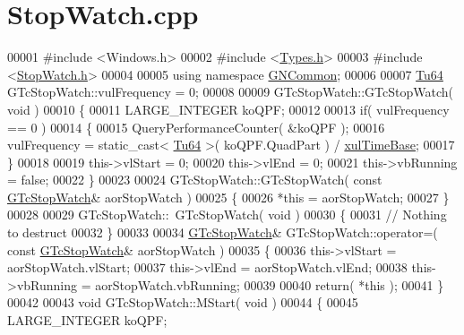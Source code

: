 \hypertarget{_stop_watch_8cpp_source}{}\section{Stop\+Watch.\+cpp}
\label{_stop_watch_8cpp_source}

\begin{DoxyCode}
00001 \textcolor{preprocessor}{#include <Windows.h>}
00002 \textcolor{preprocessor}{#include <\mbox{\hyperlink{_types_8h}{Types.h}}>}
00003 \textcolor{preprocessor}{#include <\mbox{\hyperlink{_stop_watch_8h}{StopWatch.h}}>}
00004 
00005 \textcolor{keyword}{using namespace }\mbox{\hyperlink{namespace_g_n_common}{GNCommon}};
00006 
00007 \mbox{\hyperlink{namespace_g_n_common_a9404ee6090c788ae70aebd1436ceb97d}{Tu64}} GTcStopWatch::vulFrequency = 0;
00008 
00009 GTcStopWatch::GTcStopWatch( \textcolor{keywordtype}{void} )
00010 \{
00011    LARGE\_INTEGER koQPF;
00012 
00013    \textcolor{keywordflow}{if}( vulFrequency == 0 )
00014    \{
00015       QueryPerformanceCounter( &koQPF );
00016       vulFrequency = \textcolor{keyword}{static\_cast<} \mbox{\hyperlink{namespace_g_n_common_a9404ee6090c788ae70aebd1436ceb97d}{Tu64}} \textcolor{keyword}{>}( koQPF.QuadPart ) / \mbox{\hyperlink{class_g_n_common_1_1_g_tc_stop_watch_a525b6eebced7d4d9c3812788cfde2b75}{xulTimeBase}};
00017    \}
00018 
00019    this->vlStart   = 0;
00020    this->vlEnd     = 0;
00021    this->vbRunning = \textcolor{keyword}{false};
00022 \}
00023 
00024 GTcStopWatch::GTcStopWatch( \textcolor{keyword}{const} \mbox{\hyperlink{class_g_n_common_1_1_g_tc_stop_watch}{GTcStopWatch}}& aorStopWatch )
00025 \{
00026    *\textcolor{keyword}{this} = aorStopWatch;
00027 \}
00028 
00029 GTcStopWatch::~GTcStopWatch( \textcolor{keywordtype}{void} )
00030 \{
00031    \textcolor{comment}{// Nothing to destruct}
00032 \}
00033 
00034 \mbox{\hyperlink{class_g_n_common_1_1_g_tc_stop_watch}{GTcStopWatch}}& GTcStopWatch::operator=( \textcolor{keyword}{const} \mbox{\hyperlink{class_g_n_common_1_1_g_tc_stop_watch}{GTcStopWatch}}& aorStopWatch )
00035 \{
00036    this->vlStart   = aorStopWatch.vlStart;
00037    this->vlEnd     = aorStopWatch.vlEnd;
00038    this->vbRunning = aorStopWatch.vbRunning;
00039 
00040    \textcolor{keywordflow}{return}( *\textcolor{keyword}{this} );
00041 \}
00042 
00043 \textcolor{keywordtype}{void} GTcStopWatch::MStart( \textcolor{keywordtype}{void} )
00044 \{
00045    LARGE\_INTEGER koQPF;

\end{DoxyCode}
